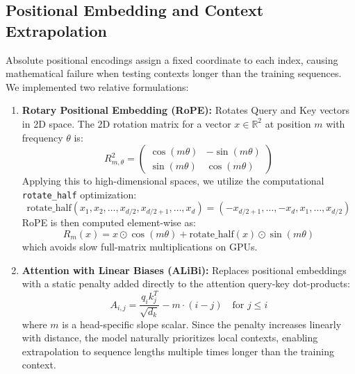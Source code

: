\documentclass[11pt,a4paper]{article}
\begin{document}
\subsection{Positional Embedding and Context Extrapolation}
Absolute positional encodings assign a fixed coordinate to each index, causing mathematical failure when testing contexts longer than the training sequences. We implemented two relative formulations:
\begin{enumerate}
    \item \textbf{Rotary Positional Embedding (RoPE):} Rotates Query and Key vectors in 2D space. The 2D rotation matrix for a vector $x \in \mathbb{R}^2$ at position $m$ with frequency $\theta$ is:
    \begin{equation}
    R_{m,\theta}^2 = \begin{pmatrix} \cos(m\theta) & -\sin(m\theta) \\ \sin(m\theta) & \cos(m\theta) \end{pmatrix}
    \end{equation}
    Applying this to high-dimensional spaces, we utilize the computational \texttt{rotate\_half} optimization:
    \begin{equation}
    \text{rotate\_half}(x_1, x_2, \dots, x_{d/2}, x_{d/2+1}, \dots, x_d) = (-x_{d/2+1}, \dots, -x_d, x_1, \dots, x_{d/2})
    \end{equation}
    RoPE is then computed element-wise as:
    \begin{equation}
    R_m(x) = x \odot \cos(m\theta) + \text{rotate\_half}(x) \odot \sin(m\theta)
    \end{equation}
    which avoids slow full-matrix multiplications on GPUs.
    \item \textbf{Attention with Linear Biases (ALiBi):} Replaces positional embeddings with a static penalty added directly to the attention query-key dot-products:
    \begin{equation}
    A_{i,j} = \frac{q_i k_j^T}{\sqrt{d_k}} - m \cdot (i - j) \quad \text{for } j \le i
    \end{equation}
    where $m$ is a head-specific slope scalar. Since the penalty increases linearly with distance, the model naturally prioritizes local contexts, enabling extrapolation to sequence lengths multiple times longer than the training context.
\end{enumerate}
\end{document}
